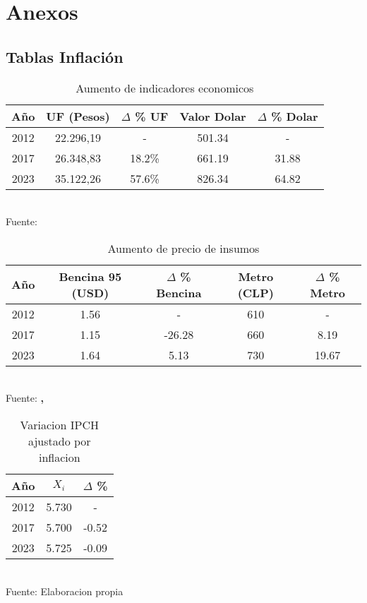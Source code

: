 \documentclass[12pt]{article} %
\begin{document}
\section{Anexos}

\subsection{Tablas Inflación}

\begin{table}[H]
    \centering
    \caption{Aumento de indicadores economicos}
    \vspace{0.2cm}
    \begin{tabular}{|c|c|c|c|c|}
        \hline
        Año & UF (Pesos) & $\Delta$ \% UF & Valor Dolar & $\Delta$ \% Dolar\\
        \hline
        2012 & 22.296,19 & - & 501.34 & - \\
        2017 & 26.348,83 & 18.2\% & 661.19 & 31.88 \\
        2023 & 35.122,26 & 57.6\% & 826.34 & 64.82 \\
        \hline
    \end{tabular}
    \vspace{0.2cm}
    \\Fuente: \textbf{\cite{sii}}
\end{table}

\begin{table}[H]
    \centering
    \caption{Aumento de precio de insumos}
    \vspace{0.2cm}
    \begin{tabular}{|c|c|c|c|c|}
        \hline
        Año &  Bencina 95 (USD) & $\Delta$ \% Bencina & Metro (CLP) & $\Delta$ \% Metro\\
        \hline
        2012 &  1.56  & - & 610 & - \\
        2017 &  1.15 & -26.28 & 660 & 8.19\\
        2023 &  1.64 & 5.13 & 730 & 19.67\\
        \hline
    \end{tabular}
    \label{Insumos}
    \vspace{0.2cm}
    \\Fuente: \textbf{\cite{tradingeconomics}, \cite{bcentral}}
\end{table}

\begin{table}[H]
    \centering
    \caption{Variacion IPCH ajustado por inflacion}
    \vspace{0.2cm}
    \begin{tabular}{|c|c|c|}
        \hline
        Año & $X_i$ & $\Delta$ \% \\
        \hline
        2012 & 5.730 & - \\
        2017 & 5.700 & -0.52 \\
        2023 & 5.725 & -0.09 \\
        \hline
    \end{tabular}
    \vspace{0.2cm}
    \label{VariacionIPCH}
    \\Fuente: Elaboracion propia
\end{table}
\end{document}
